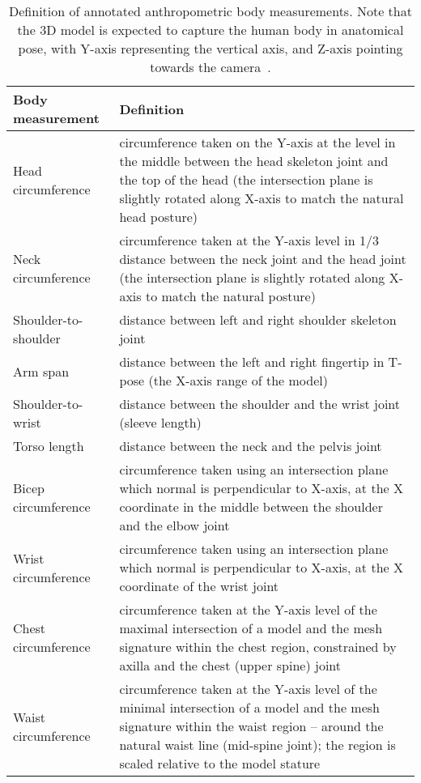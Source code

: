 \begin{table}
	\caption[Measurements provided by Surreact-APose dataset]{Definition of annotated anthropometric body measurements. Note that the 3D model is expected to capture the human body in anatomical pose, with Y-axis representing the vertical axis, and Z-axis pointing towards the camera~\cite{super}.}
	\label{measurementsSurreact}
	\begin{center}
		\footnotesize
		\begin{tabularx}{\textwidth}{lX}\hline
			Body measurement & Definition\\\hline
			\hline
			Head circumference & circumference taken on the Y-axis at the level in the middle between the head skeleton joint and the top of the head (the intersection plane is slightly rotated along X-axis to match the natural head posture)\\
			Neck circumference & circumference taken at the Y-axis level in 1/3 distance between the neck joint and the head joint (the intersection plane is slightly rotated along X-axis to match the natural posture)\\
			Shoulder-to-shoulder & distance between left and right shoulder skeleton joint\\
			Arm span & distance between the left and right fingertip in T-pose (the X-axis range of the model)\\
			Shoulder-to-wrist & distance between the shoulder and the wrist joint (sleeve length)\\
			Torso length & distance between the neck and the pelvis joint\\
			Bicep circumference & circumference taken using an intersection plane which normal is perpendicular to X-axis, at the X coordinate in the middle between the shoulder and the elbow joint\\
			Wrist circumference & circumference taken using an intersection plane which normal is perpendicular to X-axis, at the X coordinate of the wrist joint\\
			Chest circumference & circumference taken at the Y-axis level of the maximal intersection of a model and the mesh signature within the chest region, constrained by axilla and the chest (upper spine) joint\\
			Waist circumference & circumference taken at the Y-axis level of the minimal intersection of a model and the mesh signature within the waist region – around the natural waist line (mid-spine joint); the region is scaled relative to the model stature\\

\end{tabularx}
\end{center}
\end{table}
